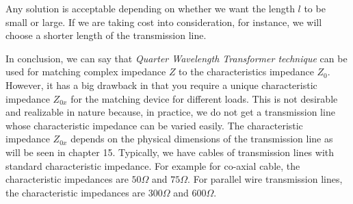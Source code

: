 Any solution is acceptable depending on whether we want the length $l$ to be small or large. If we are taking cost into consideration, for instance, we will choose a shorter length of the transmission line.

In conclusion, we can say that \textit{Quarter Wavelength Transformer technique} can be used for matching complex impedance $Z$ to the characteristics impedance $Z_0$. However, it has a big drawback in that you require a unique characteristic impedance $Z_{0x}$ for the matching device for different loads. This is not desirable and realizable in nature because, in practice, we do not get a transmission line whose characteristic impedance can be varied easily. The characteristic impedance $Z_{0x}$ depends on the physical dimensions of the transmission line as will be seen in chapter 15. Typically, we have cables of transmission lines with standard characteristic impedance. For example for co-axial cable, the characteristic impedances are $50\Omega$ and $75\Omega$. For parallel wire transmission lines, the characteristic impedances are $300\Omega$ and $600\Omega$.

